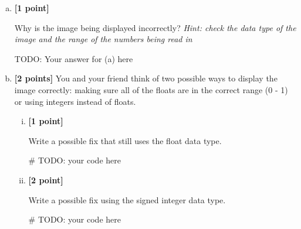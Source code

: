 \documentclass[11pt]{article}
\begin{document}
\begin{enumerate} [(a)]
    \item \textbf{[1 point]}
\begin{tcolorbox}[colback=orange!5!white,colframe=orange!75!black]
Why is the image being displayed incorrectly? \emph{Hint: check the data type of the image and the range of the numbers being read in}
\end{tcolorbox}

\begin{tcolorbox}[colback=white!5!white,colframe=green!75!black, height=3cm]
        
    TODO: Your answer for (a) here %


\end{tcolorbox}

\item \textbf{[2 points]} You and your friend think of two possible ways to display the image correctly: making sure all of the floats are in the correct range (0 - 1) or using integers instead of floats.
\begin{enumerate} [(i)]

\item \textbf{[1 point]}
\begin{tcolorbox}[colback=orange!5!white,colframe=orange!75!black]
Write a possible fix that still uses the float data type.
\end{tcolorbox}

\begin{tcolorbox}[colback=white!5!white,colframe=green!75!black, height=4cm]
\begin{python}
# TODO: your code here
\end{python}
\end{tcolorbox}

\item \textbf{[2 point]}
\begin{tcolorbox}[colback=orange!5!white,colframe=orange!75!black]
Write a possible fix using the signed integer data type.
\end{tcolorbox}

\begin{tcolorbox}[colback=white!5!white,colframe=green!75!black, height=4cm]
\begin{python}
# TODO: your code here
\end{python}
\end{tcolorbox}
\end{enumerate}


\end{enumerate}
\end{document}
